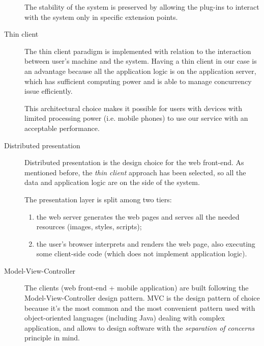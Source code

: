 \begin{description}
The stability of the system is preserved by allowing the plug-ins to interact with the system only in specific extension points.

\item[Thin client] The thin client paradigm is implemented with relation to the interaction between user's machine and the system.
Having a thin client in our case is an advantage because all the application logic is on the application server, which has sufficient computing power and is able to manage concurrency issue efficiently.

This architectural choice makes it possible for users with devices with limited processing power (i.e. mobile phones) to use our service with an acceptable performance.

\item[Distributed presentation]
Distributed presentation is the design choice for the web front-end.
As mentioned before, the \emph{thin client} approach has been selected, so all the data and application logic are on the side of the system.

The presentation layer is split among two tiers:
\begin{enumerate}
    \item the web server generates the web pages and serves all the needed resources (images, styles, scripts);
    \item the user's browser interprets and renders the web page, also executing some client-side code (which does not implement application logic).
\end{enumerate}

\item[Model-View-Controller]
The clients (web front-end + mobile application) are built following the Model-View-Controller design pattern.
MVC is the design pattern of choice because it's the most common and the most convenient pattern used with object-oriented languages (including Java) dealing with complex application, and allows to design software with the \emph{separation of concerns} principle in mind.
\end{description}
